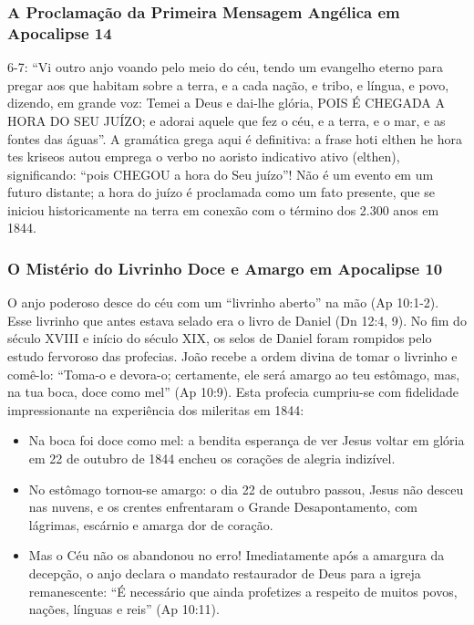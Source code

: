 \documentclass[11pt,a4paper,openany]{book}
\begin{document}
\subsubsection*{A Proclamação da Primeira Mensagem Angélica em Apocalipse 14}
6-7:
``Vi outro anjo voando pelo meio do céu, tendo um evangelho eterno para pregar aos que habitam sobre a terra, e a cada nação, e tribo, e língua, e povo, dizendo, em grande voz: Temei a Deus e dai-lhe glória, POIS É CHEGADA A HORA DO SEU JUÍZO; e adorai aquele que fez o céu, e a terra, e o mar, e as fontes das águas''.
A gramática grega aqui é definitiva: a frase hoti elthen he hora tes kriseos autou emprega o verbo no aoristo indicativo ativo (elthen), significando: ``pois CHEGOU a hora do Seu juízo''! Não é um evento em um futuro distante; a hora do juízo é proclamada como um fato presente, que se iniciou historicamente na terra em conexão com o término dos 2.300 anos em 1844.


\subsubsection*{O Mistério do Livrinho Doce e Amargo em Apocalipse 10}
O anjo poderoso desce do céu com um ``livrinho aberto'' na mão (Ap 10:1-2). Esse livrinho que antes estava selado era o livro de Daniel (Dn 12:4, 9). No fim do século XVIII e início do século XIX, os selos de Daniel foram rompidos pelo estudo fervoroso das profecias. João recebe a ordem divina de tomar o livrinho e comê-lo: ``Toma-o e devora-o; certamente, ele será amargo ao teu estômago, mas, na tua boca, doce como mel'' (Ap 10:9).
Esta profecia cumpriu-se com fidelidade impressionante na experiência dos mileritas em 1844:
\begin{itemize}
  \item Na boca foi doce como mel: a bendita esperança de ver Jesus voltar em glória em 22 de outubro de 1844 encheu os corações de alegria indizível.
  \item No estômago tornou-se amargo: o dia 22 de outubro passou, Jesus não desceu nas nuvens, e os crentes enfrentaram o Grande Desapontamento, com lágrimas, escárnio e amarga dor de coração.
  \item Mas o Céu não os abandonou no erro! Imediatamente após a amargura da decepção, o anjo declara o mandato restaurador de Deus para a igreja remanescente: ``É necessário que ainda profetizes a respeito de muitos povos, nações, línguas e reis'' (Ap 10:11).
\end{itemize}
\end{document}
